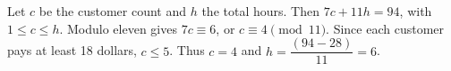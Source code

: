 Let $c$ be the customer count and $h$ the total hours. Then $7c+11h=94$, with $1\le c\le h$. Modulo eleven gives $7c\equiv6$, or $c\equiv4\pmod{11}$. Since each customer pays at least 18 dollars, $c\le5$. Thus $c=4$ and $h=\dfrac{(94-28)}{11}=\boxed6$.
